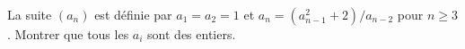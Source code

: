 La suite $(a_n)$ est définie par $a_1 = a_2 = 1$ et $a_n = (a_{n-1}^2 + 2)/a_{n-2}$ pour $n \geq 3$. Montrer que tous les $a_i$ sont des entiers.

